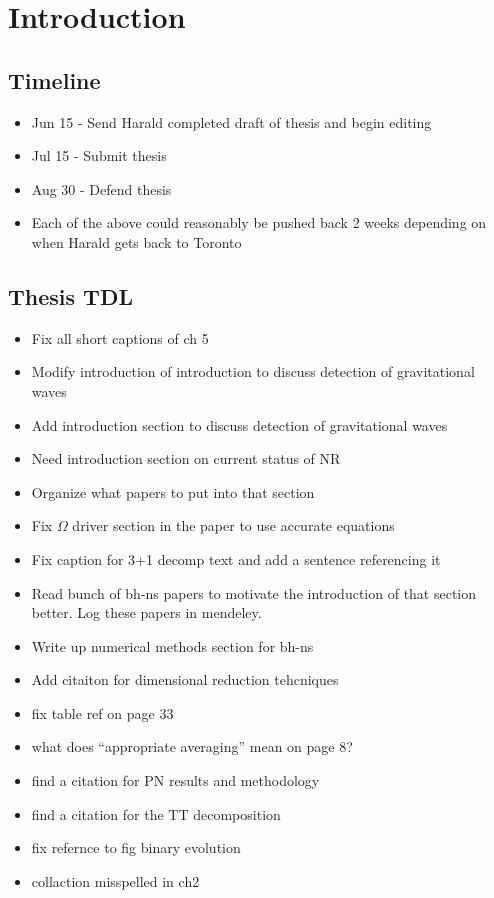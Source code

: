 \chapter{Introduction}
\label{chap:intro}

\section{Timeline}

\begin{itemize}
\item Jun 15 - Send Harald completed draft of thesis and begin editing
\item Jul 15 - Submit thesis
\item Aug 30 - Defend thesis
\item Each of the above could reasonably be pushed back 2 weeks depending on when Harald gets back to Toronto
\end{itemize}

\section{Thesis TDL}
\begin{itemize}
\item Fix all short captions of ch 5
\item Modify introduction of introduction to discuss detection of gravitational waves
\item Add introduction section to discuss detection of gravitational waves
\item Need introduction section on current status of NR
\item Organize what papers to put into that section
\item Fix $\Omega$ driver section in the paper to use accurate equations
\item Fix caption for 3+1 decomp text and add a sentence referencing it
\item Read bunch of bh-ns papers to motivate the introduction of that section better. Log these papers in mendeley.
\item Write up numerical methods section for bh-ns
\item Add citaiton for dimensional reduction tehcniques
\item fix table ref on page 33
\item what does ``appropriate averaging'' mean on page 8?
\item find a citation for PN results and methodology
\item find a citation for the TT decomposition 
\item fix refernce to fig binary evolution
\item collaction misspelled in ch2



\end{itemize}

